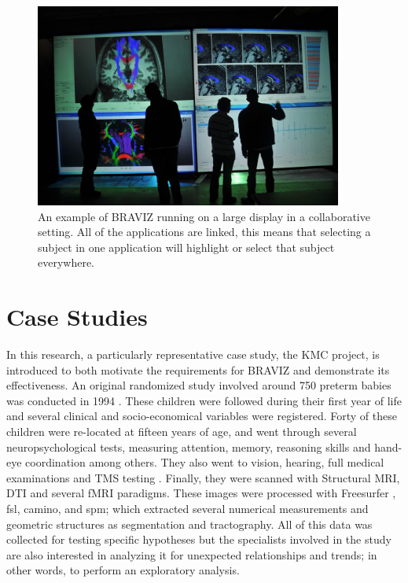 \documentclass[twocolumn]{svjour3}
\begin{document}
\begin{figure}
\begin{center}
\includegraphics[width=0.9\textwidth]{figures/imagine.jpg}
\end{center}
 \caption{\label{fig_imagine} An example of BRAVIZ running on a large display in a collaborative setting. All of the applications are linked, this means that selecting a subject in one application will highlight or select that subject everywhere.}
\end{figure}

\section{Case Studies}

In this research, a particularly representative case study, the KMC project, is introduced to both motivate the requirements for BRAVIZ and demonstrate its effectiveness. An original randomized study involved around 750 preterm babies was conducted in 1994 \cite{charpak_kangaroo_1997}. These children were followed during their first year \cite{charpak_randomized_2001}\cite{tessier_kangaroo_2009} of life and several clinical and socio-economical variables were registered. Forty of these children were re-located at fifteen years of age, and went through several neuropsychological tests, measuring attention, memory, reasoning skills and hand-eye coordination among others. They also went to vision, hearing, full medical examinations and TMS testing \cite{schneider_cerebral_2012}. Finally, they were scanned with Structural MRI, DTI and several fMRI paradigms. These images were processed with Freesurfer \cite{fischl_freesurfer_2012}, fsl\cite{jenkinson_fsl_2012}, camino\cite{cook_camino:_2006}, and spm\cite{friston_statistical_2006}; which extracted several numerical measurements and geometric structures as segmentation and tractography. All of this data was collected for testing specific hypotheses but the specialists involved in the study are also interested in analyzing it for unexpected relationships and trends; in other words, to perform an exploratory analysis.
\end{document}
